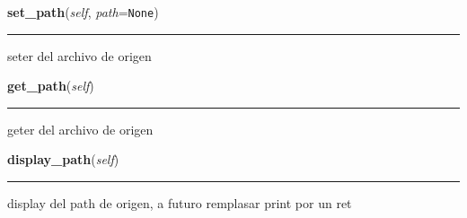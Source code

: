     \label{spectro_metria:spect:set_path}

    \vspace{0.5ex}

\hspace{.8\funcindent}\begin{boxedminipage}{\funcwidth}

    \raggedright \textbf{set\_path}(\textit{self}, \textit{path}={\tt None})

    \vspace{-1.5ex}

    \rule{\textwidth}{0.5\fboxrule}
\setlength{\parskip}{2ex}
    seter del archivo de origen

\setlength{\parskip}{1ex}
    \end{boxedminipage}

    \label{spectro_metria:spect:get_path}

    \vspace{0.5ex}

\hspace{.8\funcindent}\begin{boxedminipage}{\funcwidth}

    \raggedright \textbf{get\_path}(\textit{self})

    \vspace{-1.5ex}

    \rule{\textwidth}{0.5\fboxrule}
\setlength{\parskip}{2ex}
    geter del archivo de origen

\setlength{\parskip}{1ex}
    \end{boxedminipage}

    \label{spectro_metria:spect:display_path}

    \vspace{0.5ex}

\hspace{.8\funcindent}\begin{boxedminipage}{\funcwidth}

    \raggedright \textbf{display\_path}(\textit{self})

    \vspace{-1.5ex}

    \rule{\textwidth}{0.5\fboxrule}
\setlength{\parskip}{2ex}
    display del path de origen, a futuro remplasar print por un ret

\setlength{\parskip}{1ex}
    \end{boxedminipage}

